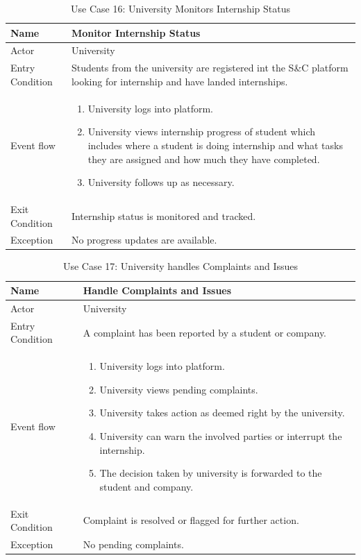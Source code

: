 \begin{table}[H]
    \centering
    \begin{tabular}{|l|p{12cm}|}
    \hline
    Name             & Monitor Internship Status \\ \hline
    Actor            & University  \\ \hline
    Entry Condition  & 
    Students from the university are registered int the S\&C platform looking for internship and have landed internships. \\ \hline
    Event flow       & 
    \begin{enumerate}
        \item University logs into platform.
        \item University views internship progress of student which includes where a student is doing internship and what tasks they are assigned and how much they have completed.
        \item University follows up as necessary.
    \end{enumerate} \\ \hline
    Exit Condition   & Internship status is monitored and tracked. \\ \hline
    Exception   &    No progress updates are available. \\ \hline
\end{tabular}
\caption{Use Case 16: University Monitors Internship Status}
\label{tab:user_signup}
\end{table}

\begin{table}[H]
    \centering
    \begin{tabular}{|l|p{12cm}|}
    \hline
    Name             & Handle Complaints and Issues  \\ \hline
    Actor            & University  \\ \hline
    Entry Condition  & 
    A complaint has been reported by a student or company. \\ \hline
    Event flow       & 
    \begin{enumerate}
        \item University logs into platform.
        \item University views pending complaints.
        \item University takes action as deemed right by the university.
        \item University can warn the involved parties or interrupt the internship.
        \item The decision taken by university is forwarded to the student and company.
    \end{enumerate} \\ \hline
    Exit Condition   & Complaint is resolved or flagged for further action. \\ \hline
    Exception   &  No pending complaints. \\ \hline
\end{tabular}
\caption{Use Case 17: University handles Complaints and Issues}
\label{tab:user_signup}
\end{table}


